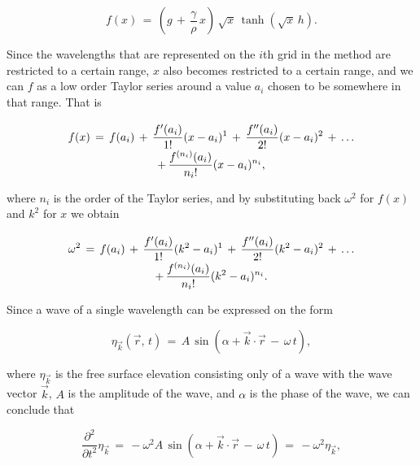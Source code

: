 \begin{equation} \label{eq:dispersion_modified}
f(x) \,=\, \left(g\,+\,\frac{\gamma}{\rho}\,x\right)\,\sqrt{x}\,\tanh(\sqrt{x}\,h).
\end{equation}

Since the wavelengths that are represented on the $i$th grid in the method are restricted to a certain range, $x$ also becomes restricted to a certain range, and we can \approximate $f$ as a low order Taylor series around a value $a_i$ chosen to be somewhere in that range. That is

\begin{equation} \label{eq:dispersion_modified_taylor}
\renewcommand*{\arraystretch}{2}
\begin{array}{c}
\displaystyle f(x) \,=\, f(a_i) \,+\, \frac{f'(a_i)}{1!}(x-a_i)^1 \,+\, \frac{f''(a_i)}{2!}(x-a_i)^2 \,+\, \dots \\
\displaystyle +\, \frac{f^{(n_i)}(a_i)}{n_i!}(x-a_i)^{n_i},
\end{array}
\end{equation}

where $n_i$ is the order of the Taylor series, and by substituting back $\omega^2$ for $f(x)$ and $k^2$ for $x$ we obtain

\begin{equation} \label{eq:dispersion_taylor}
\renewcommand*{\arraystretch}{2}
\begin{array}{c}
\displaystyle \omega^2 \,=\, f(a_i) \,+\, \frac{f'(a_i)}{1!}(k^2-a_i)^1 \,+\, \frac{f''(a_i)}{2!}(k^2-a_i)^2 \,+\, \dots \\
\displaystyle +\, \frac{f^{(n_i)}(a_i)}{n_i!}(k^2-a_i)^{n_i}.
\end{array}
\end{equation}

Since a wave of a single wavelength can be expressed on the form

\begin{equation} \label{eq:component_sin}
\eta_{\vec{k}}(\vec{r},\,t) \,=\, A\,\sin(\alpha + \vec{k}\cdot\vec{r}\,-\,\omega\,t),
\end{equation}

where $\eta_{\vec{k}}$ is the free surface elevation consisting only of a wave with the wave vector $\vec{k}$, $A$ is the amplitude of the wave, and $\alpha$ is the phase of the wave, we can conclude that

\begin{equation} \label{eq:component_second_time_derivative}
\frac{\partial^2}{\partial t^2}\eta_{\vec{k}} \,=\, -\omega^2 A\,\sin(\alpha + \vec{k}\cdot\vec{r}\,-\,\omega\,t) \,=\, -\omega^2\eta_{\vec{k}},
\end{equation}

